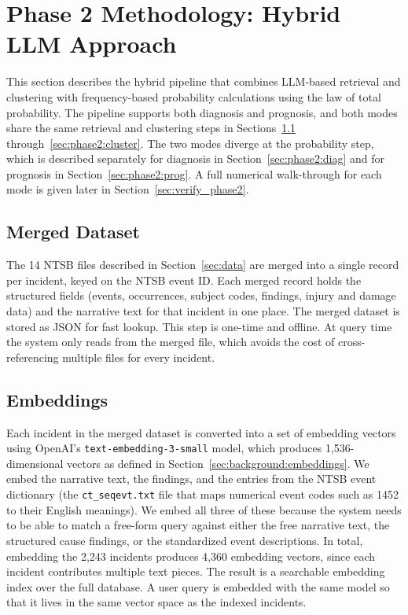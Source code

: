 \documentclass[11pt]{article}
\begin{document}
\section{Phase 2 Methodology: Hybrid LLM Approach}
\label{sec:phase2}

This section describes the hybrid pipeline that combines LLM-based retrieval and clustering with frequency-based probability calculations using the law of total probability. The pipeline supports both diagnosis and prognosis, and both modes share the same retrieval and clustering steps in Sections~\ref{sec:phase2:dataset} through~\ref{sec:phase2:cluster}. The two modes diverge at the probability step, which is described separately for diagnosis in Section~\ref{sec:phase2:diag} and for prognosis in Section~\ref{sec:phase2:prog}. A full numerical walk-through for each mode is given later in Section~\ref{sec:verify_phase2}.

\subsection{Merged Dataset}
\label{sec:phase2:dataset}

The 14 NTSB files described in Section~\ref{sec:data} are merged into a single record per incident, keyed on the NTSB event ID. Each merged record holds the structured fields (events, occurrences, subject codes, findings, injury and damage data) and the narrative text for that incident in one place. The merged dataset is stored as JSON for fast lookup. This step is one-time and offline. At query time the system only reads from the merged file, which avoids the cost of cross-referencing multiple files for every incident.

\subsection{Embeddings}
\label{sec:phase2:embeddings}

Each incident in the merged dataset is converted into a set of embedding vectors using OpenAI's \texttt{text-embedding-3-small} model, which produces 1{,}536-dimensional vectors as defined in Section~\ref{sec:background:embeddings}. We embed the narrative text, the findings, and the entries from the NTSB event dictionary (the \texttt{ct\_seqevt.txt} file that maps numerical event codes such as 1452 to their English meanings). We embed all three of these because the system needs to be able to match a free-form query against either the free narrative text, the structured cause findings, or the standardized event descriptions. In total, embedding the 2{,}243 incidents produces 4{,}360 embedding vectors, since each incident contributes multiple text pieces. The result is a searchable embedding index over the full database. A user query is embedded with the same model so that it lives in the same vector space as the indexed incidents.
\end{document}
